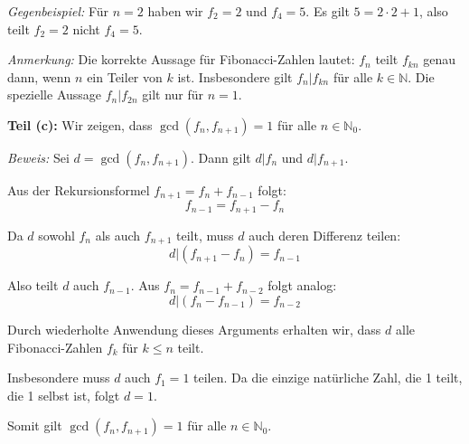 \documentclass{article}
\begin{document}
\textit{Gegenbeispiel:} Für $n = 2$ haben wir $f_2 = 2$ und $f_4 = 5$. Es gilt $5 = 2 \cdot 2 + 1$, also teilt $f_2 = 2$ nicht $f_4 = 5$.

\textit{Anmerkung:} Die korrekte Aussage für Fibonacci-Zahlen lautet: $f_n$ teilt $f_{kn}$ genau dann, wenn $n$ ein Teiler von $k$ ist. Insbesondere gilt $f_n | f_{kn}$ für alle $k \in \mathbb{N}$. Die spezielle Aussage $f_n | f_{2n}$ gilt nur für $n = 1$.

\vspace{0.5cm}

\textbf{Teil (c):} Wir zeigen, dass $\gcd(f_n, f_{n+1}) = 1$ für alle $n \in \mathbb{N}_0$.

\textit{Beweis:} Sei $d = \gcd(f_n, f_{n+1})$. Dann gilt $d | f_n$ und $d | f_{n+1}$.

Aus der Rekursionsformel $f_{n+1} = f_n + f_{n-1}$ folgt:
$$f_{n-1} = f_{n+1} - f_n$$

Da $d$ sowohl $f_n$ als auch $f_{n+1}$ teilt, muss $d$ auch deren Differenz teilen:
$$d | (f_{n+1} - f_n) = f_{n-1}$$

Also teilt $d$ auch $f_{n-1}$. Aus $f_n = f_{n-1} + f_{n-2}$ folgt analog:
$$d | (f_n - f_{n-1}) = f_{n-2}$$

Durch wiederholte Anwendung dieses Arguments erhalten wir, dass $d$ alle Fibonacci-Zahlen $f_k$ für $k \leq n$ teilt.

Insbesondere muss $d$ auch $f_1 = 1$ teilen. Da die einzige natürliche Zahl, die 1 teilt, die 1 selbst ist, folgt $d = 1$.

Somit gilt $\gcd(f_n, f_{n+1}) = 1$ für alle $n \in \mathbb{N}_0$.
\end{document}
